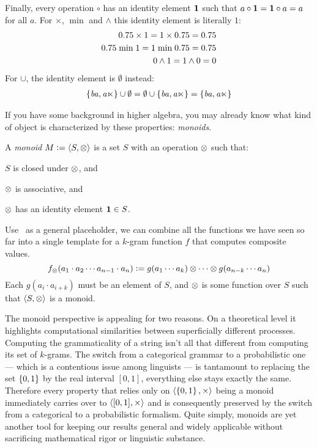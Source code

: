 Finally, every operation $\circ$ has an identity element $\mathbf{1}$ such that $a \circ \mathbf{1} = \mathbf{1} \circ a = a$ for all $a$.
For $\times$, $\mathrel{\text{min}}$ and $\wedge$ this identity element is literally $1$:
%
\begin{align*}
    0.75 \times 1 = 1 \times 0.75 = 0.75\\
    0.75 \mathrel{\text{min}} 1 = 1 \mathrel{\text{min}} 0.75 = 0.75\\
    0 \wedge 1 = 1 \wedge 0 = 0
\end{align*}
%
For $\cup$, the identity element is $\emptyset$ instead:
%
\begin{align*}
    \left \{ \mathit{ba},\mathit{a\ltimes} \right \} \cup \emptyset
    =
    \emptyset \cup \left \{ \mathit{ba},\mathit{a\ltimes} \right \}
    =
    \left \{ \mathit{ba},\mathit{a\ltimes} \right \}
\end{align*}

If you have some background in higher algebra, you may already know what kind of object is characterized by these properties: \emph{monoids}.
%
\begin{definition}[Monoid]
    A \emph{monoid} $M \mathrel{\mathop:}= \left \langle S, \otimes \right \rangle $ is a set $S$ with an operation $\otimes$ such that:
    \begin{itemize*}
        \item $S$ is closed under $\otimes$, and
        \item $\otimes$ is associative, and
        \item $\otimes$ has an identity element $\mathbf{1} \in S$.
    \end{itemize*}
\end{definition}
%
Use \semimult\ as a general placeholder, we can combine all the functions we have seen so far into a single template for a $k$-gram function $f$ that computes composite values.
%
\[
    f_{\otimes}(a_1 \cdot a_2 \cdots a_{n-1} \cdot a_n) \mathrel{\mathop:}=
        g(a_1 \cdots a_k) \otimes \cdots \otimes g(a_{n-k} \cdots a_n)
\]
%
Each $g(a_i \cdot a_{i+k})$ must be an element of $S$, and $\otimes$ is some function over $S$ such that $\left \langle S,\otimes \right \rangle $ is a monoid.

The monoid perspective is appealing for two reasons.
On a theoretical level it highlights computational similarities between superficially different processes. 
Computing the grammaticality of a string isn't all that different from computing its set of $k$-grams.
The switch from a categorical grammar to a probabilistic one --- which is a contentious issue among linguists --- is tantamount to replacing the set $\left \{ 0,1 \right \}$ by the real interval $[0,1]$, everything else stays exactly the same.
Therefore every property that relies only on $\left \langle \left \{ 0,1 \right \},\times \right \rangle $ being a monoid immediately carries over to $\left \langle [0,1], \times \right \rangle $ and is consequently preserved by the switch from a categorical to a probabilistic formalism.
Quite simply, monoids are yet another tool for keeping our results general and widely applicable without sacrificing mathematical rigor or linguistic substance.


